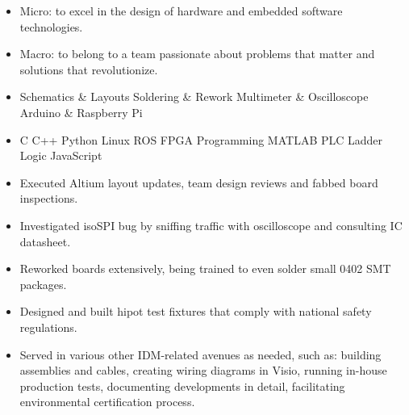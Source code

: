 \documentclass{resume}
\begin{document}




\begin{itemize}[parsep=0.5ex]
  \item Micro: to excel in the design of hardware and embedded software technologies.
  \item Macro: to belong to a team passionate about problems that matter and solutions that revolutionize.
\end{itemize}


\begin{itemize}[parsep=0.5ex]
  \item %
  Schematics \& Layouts\textperiodcentered
  Soldering \& Rework\textperiodcentered
  Multimeter \& Oscilloscope\textperiodcentered
  Arduino \& Raspberry Pi

  \item %
  C\textperiodcentered
  C++\textperiodcentered
  Python\textperiodcentered
  Linux\textperiodcentered
  ROS\textperiodcentered
  FPGA Programming\textperiodcentered
  MATLAB\textperiodcentered
  PLC Ladder Logic\textperiodcentered
  JavaScript%

\end{itemize}


\begin{itemize}
  \item Executed Altium layout updates, team design reviews and fabbed board inspections.
  \item Investigated isoSPI bug by sniffing traffic with oscilloscope and consulting IC datasheet.
  \item Reworked boards extensively, being trained to even solder small 0402 SMT packages.
  \item Designed and built hipot test fixtures that comply with national safety regulations.
  \item Served in various other IDM-related avenues as needed, such as: building assemblies and cables, creating wiring diagrams in Visio, running in-house production tests, documenting developments in detail, facilitating environmental certification process.
\end{itemize}
\end{document}
